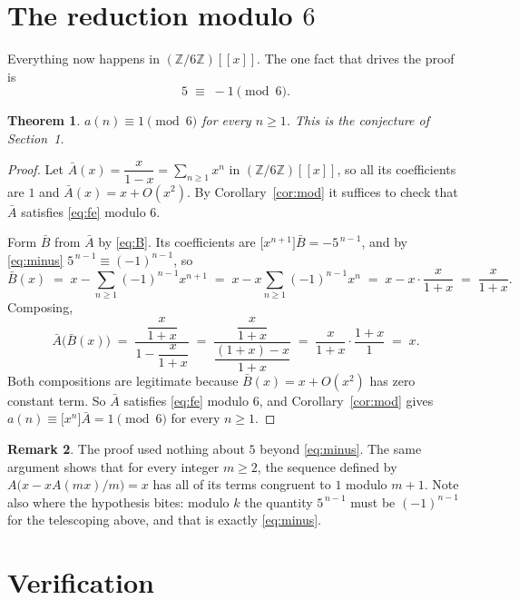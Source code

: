 \documentclass[11pt,a4paper]{article}
\theoremstyle{plain}
\newtheorem{theorem}{Theorem}
\theoremstyle{definition}
\newtheorem{remark}[theorem]{Remark}
\begin{document}
\section{The reduction modulo $6$}

Everything now happens in $(\mathbb{Z}/6\mathbb{Z})[[x]]$. The one fact that drives the proof is
\begin{equation}\label{eq:minus}
5\;\equiv\;-1 \pmod{6} .
\end{equation}

\begin{theorem}\label{thm:main}
$a(n)\equiv1\pmod{6}$ for every $n\ge1$. This is the conjecture of Section~1.
\end{theorem}

\begin{proof}
Let $\bar A(x)=\dfrac{x}{1-x}=\sum_{n\ge1}x^{n}$ in $(\mathbb{Z}/6\mathbb{Z})[[x]]$, so all its
coefficients are $1$ and $\bar A(x)=x+O(x^{2})$. By Corollary~\ref{cor:mod} it suffices to
check that $\bar A$ satisfies \eqref{eq:fe} modulo $6$.

Form $\bar B$ from $\bar A$ by \eqref{eq:B}. Its coefficients are
$\bigl[x^{n+1}\bigr]\bar B=-5^{\,n-1}$, and by \eqref{eq:minus}
$5^{\,n-1}\equiv(-1)^{n-1}$, so
\[
\bar B(x)\;=\;x-\sum_{n\ge1}(-1)^{n-1}x^{n+1}
\;=\;x-x\sum_{n\ge1}(-1)^{n-1}x^{n}
\;=\;x-x\cdot\frac{x}{1+x}
\;=\;\frac{x}{1+x} .
\]
Composing,
\[
\bar A\bigl(\bar B(x)\bigr)\;=\;\frac{\dfrac{x}{1+x}}{1-\dfrac{x}{1+x}}
\;=\;\frac{\dfrac{x}{1+x}}{\dfrac{(1+x)-x}{1+x}}
\;=\;\frac{x}{1+x}\cdot\frac{1+x}{1}\;=\;x .
\]
Both compositions are legitimate because $\bar B(x)=x+O(x^{2})$ has zero constant term.
So $\bar A$ satisfies \eqref{eq:fe} modulo $6$, and Corollary~\ref{cor:mod} gives
$a(n)\equiv\bigl[x^{n}\bigr]\bar A=1\pmod{6}$ for every $n\ge1$.
\end{proof}

\begin{remark}
The proof used nothing about $5$ beyond \eqref{eq:minus}. The same argument shows that
for every integer $m\ge2$, the sequence defined by $A\bigl(x-xA(mx)/m\bigr)=x$ has all of
its terms congruent to $1$ modulo $m+1$. Note also where the hypothesis bites: modulo $k$
the quantity $5^{\,n-1}$ must be $(-1)^{n-1}$ for the telescoping above, and that is
exactly \eqref{eq:minus}.
\end{remark}

\section{Verification}
\end{document}
